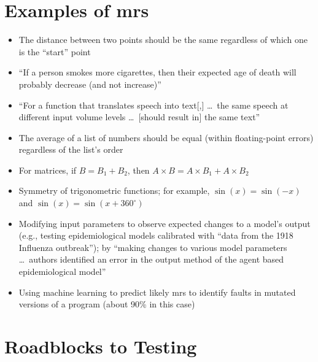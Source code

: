 \section[Examples of Metamorphic Relations]{Examples of \acfp{mr}}
\begin{itemize}
    \item The distance between two points should be the same regardless of
          which one is the ``start'' point \citep[p.~22]{IEEE2021}
    \item ``If a person smokes more cigarettes, then their expected age of
          death will probably decrease (and not increase)''
          \citep[p.~22]{IEEE2021}
    \item ``For a function that translates speech into text[,] \dots\ the
          same speech at different input volume levels \dots\ [should result
          in] the same text'' \citep[p.~22]{IEEE2021}
    \item The average of a list of numbers should be equal (within
          floating-point errors) regardless of the list's order
          \citep[p.~67]{KanewalaAndYuehChen2019}
    \item For matrices, if $B = B_1 + B_2$, then $A \times B = A \times B_1
              + A \times B_2$ \citep[pp.~68-69]{KanewalaAndYuehChen2019}
    \item Symmetry of trigonometric functions; for example, $\sin(x) = \sin(-x)$
          and $\sin(x) = \sin(x + 360^{\circ})$ \citep[p.~70]{KanewalaAndYuehChen2019}
    \item Modifying input parameters to observe expected changes to a model's
          output (e.g., testing epidemiological models calibrated with
          ``data from the 1918 Influenza outbreak''); by ``making changes to
          various model parameters \dots\ authors identified an error in the
          output method of the agent based epidemiological model''
          \citep[p.~70]{KanewalaAndYuehChen2019}
    \item Using machine learning to predict likely \acsp{mr} to identify
          faults in mutated versions of a program (about 90\% in this case)
          \citep[p.~71]{KanewalaAndYuehChen2019}
\end{itemize}

\section{Roadblocks to Testing}

